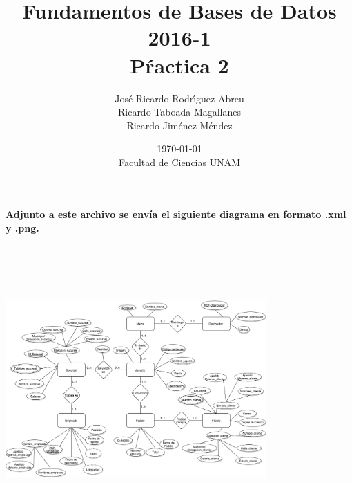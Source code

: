 \documentclass[letterpaper,11pt]{article}
\title{Fundamentos de Bases de Datos 2016-1\\Pŕactica 2}
\author{Jos\'e Ricardo Rodr\'{\i}guez Abreu \\ Ricardo Taboada Magallanes \\ Ricardo Jim\'enez M\'endez}
\date{\today\\ Facultad de Ciencias UNAM}
\begin{document}
 
 \maketitle

 
 \begin{center}
   {\bf Adjunto a este archivo se envía el siguiente diagrama en formato .xml y .png.}
  
 \end{center}
 \\
 
  {\raggedleft{}  \includegraphics[width=10cm, height=10cm]{Pactica2} }
   
 
\end{document}
